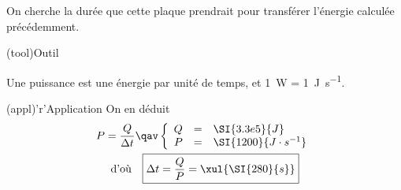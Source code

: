 \documentclass[../main/main.tex]{subfiles}
\begin{document}
{\begin{enumerate}
\begin{tcbraster}[raster columns=2, raster equal height=rows]
\begin{tcb}[]
				      On cherche la durée que cette plaque prendrait pour
				      transférer l'énergie calculée précédemment.

			      \end{tcb}
		      \end{tcbraster}
		      \begin{tcbraster}[raster columns=2, raster equal height=rows]
			      \begin{tcb}[](tool){Outil}

				      Une puissance est une énergie par unité de temps, et
				      \SI{1}{W} = \SI{1}{J.s^{-1}}.

			      \end{tcb}
			      \begin{tcb}(appl)'r'{Application}
				      On en déduit
				      \begin{gather*}
					      P = \frac{Q}{\Delta t}
					      \qav
					      \left\{
					      \begin{array}{rcl}
						      Q & = & \SI{3.3e5}{J}            \\
						      P & = & \SI{1200}{J\cdot s^{-1}}
					      \end{array}
					      \right.
					      \\
					      \text{d'où}\quad
					      \boxed{\Delta t = \frac{Q}{P} = \xul{\SI{280}{s}}}
				      \end{gather*}
			      \end{tcb}
		      \end{tcbraster}
	\end{enumerate}
}
\end{document}
